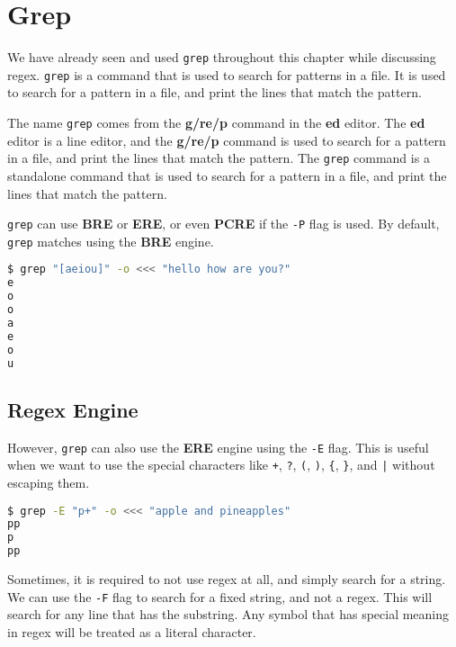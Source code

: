 \chapter{Grep}

We have already seen and used \lstinline|grep| throughout this chapter while discussing regex. \lstinline|grep| is a command that is used to search for patterns in a file. It is used to search for a pattern in a file, and print the lines that match the pattern.

The name \lstinline|grep| comes from the \textbf{g/re/p} command in the \textbf{ed} editor. The \textbf{ed} editor is a line editor, and the \textbf{g/re/p} command is used to search for a pattern in a file, and print the lines that match the pattern. The \lstinline|grep| command is a standalone command that is used to search for a pattern in a file, and print the lines that match the pattern.

\lstinline|grep| can use \textbf{BRE} or \textbf{ERE}, or even \textbf{PCRE} if the \lstinline|-P| flag is used. By default, \lstinline|grep| matches using the \textbf{BRE} engine.

\begin{lstlisting}[language=bash]
$ grep "[aeiou]" -o <<< "hello how are you?"
e
o
o
a
e
o
u
\end{lstlisting}

\section{Regex Engine}

However, \lstinline|grep| can also use the \textbf{ERE} engine using the \lstinline|-E| flag. This is useful when we want to use the special characters like \lstinline|+|, \lstinline|?|, \lstinline|(|, \lstinline|)|, \lstinline|{|, \lstinline|}|, and \lstinline:|: without escaping them.

\begin{lstlisting}[language=bash]
$ grep -E "p+" -o <<< "apple and pineapples"
pp
p
pp
\end{lstlisting}

Sometimes, it is required to not use regex at all, and simply search for a string. We can use the \lstinline|-F| flag to search for a fixed string, and not a regex.
This will search for any line that has the substring. Any symbol that has special meaning in regex will be treated as a literal character.

